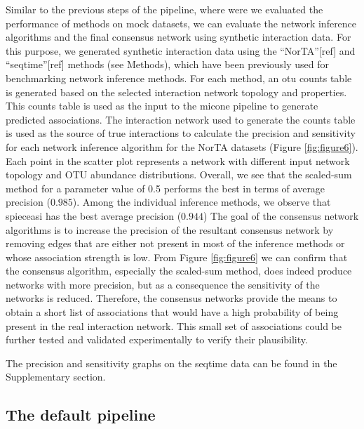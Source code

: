   Similar to the previous steps of the pipeline, where were we evaluated the performance of methods on mock datasets, we can evaluate the network inference algorithms and the final consensus network using synthetic interaction data.
  For this purpose, we generated synthetic interaction data using the ``NorTA''[ref] and ``seqtime''[ref] methods (see Methods), which have been previously used for benchmarking network inference methods.
  For each method, an \ac{otu} counts table is generated based on the selected interaction network topology and properties.
  This counts table is used as the input to the \ac{micone} pipeline to generate predicted associations.
  The interaction network used to generate the counts table is used as the source of true interactions to calculate the precision and sensitivity for each network inference algorithm for the NorTA datasets (Figure \ref{fig:figure6}).
  Each point in the scatter plot represents a network with different input network topology and OTU abundance distributions.
  Overall, we see that the scaled-sum method for a parameter value of 0.5 performs the best in terms of average precision ($0.985$).
  Among the individual inference methods, we observe that \ac{spieceasi} has the best average precision ($0.944$)
  The goal of the consensus network algorithms is to increase the precision of the resultant consensus network by removing edges that are either not present in most of the inference methods or whose association strength is low.
  From Figure \ref{fig:figure6} we can confirm that the consensus algorithm, especially the scaled-sum method, does indeed produce networks with more precision, but as a consequence the sensitivity of the networks is reduced.
  Therefore, the consensus networks provide the means to obtain a short list of associations that would have a high probability of being present in the real interaction network.
  This small set of associations could be further tested and validated experimentally to verify their plausibility.

  The precision and sensitivity graphs on the seqtime data can be found in the Supplementary section.

  \FloatBarrier

  \subsection*{The default pipeline}

